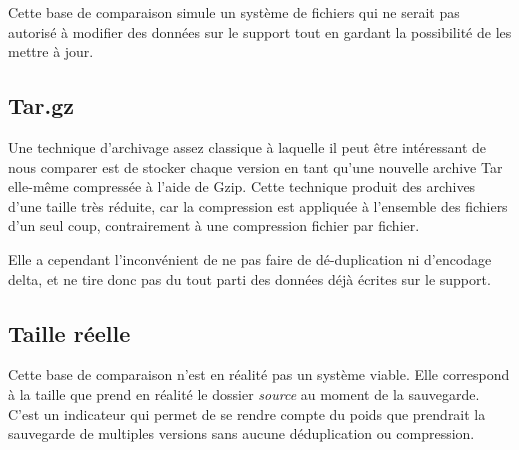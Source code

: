 \documentclass[a4paper]{report}
\begin{document}
Cette base de comparaison simule un système de fichiers qui ne serait
pas autorisé à modifier des données sur le support tout en gardant la
possibilité de les mettre à jour.

\subsection{Tar.gz}

Une technique d'archivage assez classique à laquelle il peut être
intéressant de nous comparer est de stocker chaque version en tant
qu'une nouvelle archive Tar elle-même compressée à l'aide de Gzip. Cette
technique produit des archives d'une taille très réduite, car la
compression est appliquée à l'ensemble des fichiers d'un seul coup,
contrairement à une compression fichier par fichier.

Elle a cependant l'inconvénient de ne pas faire de dé-duplication ni
d'encodage delta, et ne tire donc pas du tout parti des données déjà
écrites sur le support.

\subsection{Taille réelle}

Cette base de comparaison n'est en réalité pas un système viable. Elle
correspond à la taille que prend en réalité le dossier \emph{source} au
moment de la sauvegarde. C'est un indicateur qui permet de se rendre
compte du poids que prendrait la sauvegarde de multiples versions sans
aucune déduplication ou compression.
\end{document}
